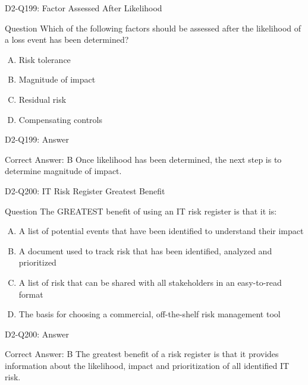 \documentclass{beamer}
\begin{document}
	\begin{frame}{D2-Q199: Factor Assessed After Likelihood}
		\begin{block}{Question}
			Which of the following factors should be assessed after the likelihood of a loss event has been determined?
		\end{block}
		\begin{enumerate}[(A)]
			\item Risk tolerance
			\item Magnitude of impact
			\item Residual risk
			\item Compensating controls
		\end{enumerate}
	\end{frame}
	\begin{frame}{D2-Q199: Answer}
		\begin{block}{Correct Answer: B}
			Once likelihood has been determined, the next step is to determine magnitude of impact.
		\end{block}
	\end{frame}
	
	\begin{frame}{D2-Q200: IT Risk Register Greatest Benefit}
		\begin{block}{Question}
			The GREATEST benefit of using an IT risk register is that it is:
		\end{block}
		\begin{enumerate}[(A)]
			\item A list of potential events that have been identified to understand their impact
			\item A document used to track risk that has been identified, analyzed and prioritized
			\item A list of risk that can be shared with all stakeholders in an easy-to-read format
			\item The basis for choosing a commercial, off-the-shelf risk management tool
		\end{enumerate}
	\end{frame}
	\begin{frame}{D2-Q200: Answer}
		\begin{block}{Correct Answer: B}
			The greatest benefit of a risk register is that it provides information about the likelihood, impact and prioritization of all identified IT risk.
		\end{block}
	\end{frame}
	
\end{document}
